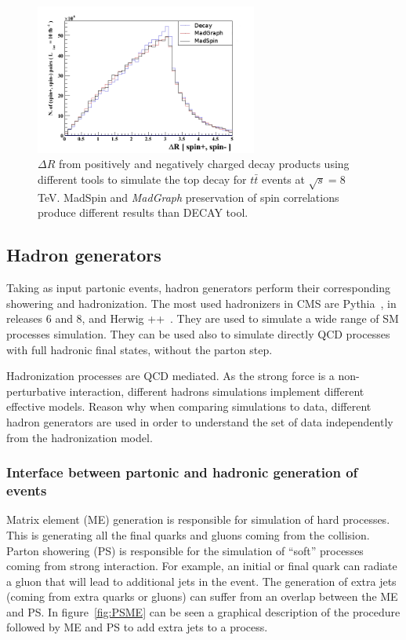 \begin{figure}[!Hhtbp]
  \begin{center}
    \includegraphics[width=0.65\textwidth]{figs/TT_MadSPin_2.png}
    \caption{$\Delta R$ from positively and negatively charged decay products using different tools to simulate the top decay for $t\bar{t}$ events at $\sqrt{s}=8$ TeV. MadSpin and \textit{MadGraph} preservation of spin correlations produce different results than DECAY tool.}
    \label{fig:MS2}
  \end{center}
\end{figure}

\subsection{Hadron generators}
\label{sec:Had}

Taking as input partonic events, hadron generators perform their corresponding showering and hadronization. The most used hadronizers in CMS are Pythia~\cite{Sjostrand:2006za}, in releases 6 and 8, and Herwig ++~\cite{Bahr:2008pv}. They are used to simulate a wide range of SM processes simulation. They can be used also to simulate directly QCD processes with full hadronic final states, without the parton step.

Hadronization processes are QCD mediated. As the strong force is a non-perturbative interaction, different hadrons simulations implement different effective models. Reason why when comparing simulations to data, different hadron generators are used in order to understand the set of data independently from the hadronization model. 

\subsubsection{Interface between partonic and hadronic generation of events}
\label{sec:Merging}

Matrix element (ME) generation is responsible for simulation of hard processes. This is generating all the final quarks and gluons coming from the collision. Parton showering (PS) is responsible for the simulation of ``soft'' processes coming from strong interaction. For example, an initial or final quark can radiate a gluon that will lead to additional jets in the event. The generation of extra jets (coming from extra quarks or gluons) can suffer from an overlap between the ME and PS. In figure~\ref{fig:PSME} can be seen a graphical description of the procedure followed by ME and PS to add extra jets to a process. 

